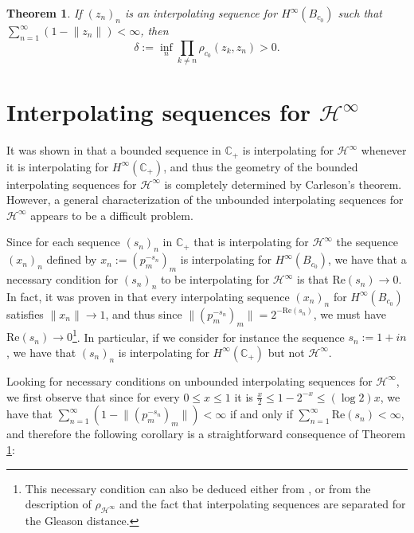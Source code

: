 \documentclass[preprint,12pt,number]{elsarticle}
\newtheorem{theorem}{Theorem}[section]
\newcommand{\C}{\mathbb{C}}
\begin{document}

\begin{theorem}\label{Teo-Bc0}
    If $(z_n)_n$ is an interpolating sequence for $H^\infty(B_{c_0})$ such that $\sum_{n=1}^\infty(1-\lVert z_n\rVert)<\infty$, then 
    \[
    \delta:=\inf_n \prod_{k\neq n}\rho_{c_0}(z_k,z_n)>0.
    \]
\end{theorem}

\section{Interpolating sequences for $\mathscr{H}^{\infty}$}\label{Section-4}
\vspace{0.3cm}
It was shown in \cite{seip2009interpolation} that a bounded sequence in $\C_+$ is interpolating for $\mathscr{H}^{\infty}$ whenever it is interpolating for $H^\infty(\C_+)$, and thus the geometry of the bounded interpolating sequences for $\mathscr{H}^{\infty}$ is completely determined by Carleson's theorem. However, a general characterization of the unbounded interpolating sequences for $\mathscr{H}^{\infty}$ appears to be a difficult problem. 

Since for each sequence $(s_n)_n$ in $\C_+$ that is interpolating for $\mathscr{H}^{\infty}$ the sequence $(x_n)_n$ defined by $x_n:=(p_m^{-s_n})_{m}$ is interpolating for $H^\infty(B_{c_0})$, we have that a necessary condition for $(s_n)_n$ to be interpolating for $\mathscr{H}^{\infty}$ is that $\text{Re}(s_n)\to 0$. In fact, it was proven in \cite{GalindoLindstromMiralles2009} that every interpolating sequence $(x_n)_n$ for $H^\infty(B_{c_0})$ satisfies $\lVert x_n\rVert\to 1$, and thus since $\lVert (p_m^{-s_n})_{m}\rVert=2^{-\text{Re}(s_n)}$, we must have $\text{Re}(s_n)\to 0$\footnote{This necessary condition can also be deduced either from \cite{seip2009interpolation}, or from the description of $\rho_{\mathscr{H}^{\infty}}$ and the fact that interpolating sequences are separated for the Gleason distance.}. In particular, if we consider for instance the sequence $s_n:=1+in$, we have that $(s_n)_n$ is interpolating for $H^\infty(\C_+)$ but not $\mathscr{H}^{\infty}$. 

Looking for necessary conditions on unbounded interpolating sequences for $\mathscr{H}^{\infty}$, we first observe that since for every $0\leq x\leq 1$ it is $\frac{x}{2}\leq 1-2^{-x}\leq (\log2) x$, we have that $\sum_{n=1}^\infty(1-\lVert (p_m^{-s_n})_{m}\rVert)<\infty$ if and only if $\sum_{n=1}^\infty \text{Re}(s_n)<\infty$, and therefore the following corollary is a straightforward consequence of Theorem \ref{Teo-Bc0}:
\end{document}
